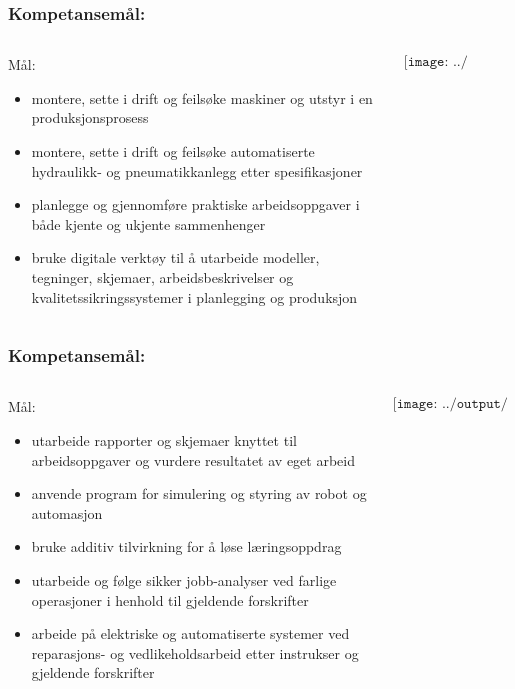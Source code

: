 \documentclass[aspectratio=169,xcolor=dvipsnames]{beamer}
\begin{document}
\begin{frame}
	\frametitle{Kompetansemål:}

	\begin{columns}
		\begin{column}{0.5\textwidth}
			Mål:
			\begin{itemize}
				
				\item montere, sette i drift og feilsøke maskiner og utstyr i en produksjonsprosess
				\item montere, sette i drift og feilsøke automatiserte hydraulikk- og pneumatikkanlegg etter spesifikasjoner 
				\item planlegge og gjennomføre praktiske arbeidsoppgaver i både kjente og ukjente sammenhenger 
				\item bruke digitale verktøy til å utarbeide modeller, tegninger, skjemaer, arbeidsbeskrivelser og kvalitetssikringssystemer i planlegging og produksjon 

			\end{itemize}
		\end{column}

		\begin{column}{0.5\textwidth}
			$$\texttt{[image: ../output/noGPLimages/udir.pdf]}$$
		\end{column}
	\end{columns}
\end{frame}
\begin{frame}
	\frametitle{Kompetansemål:}

	\begin{columns}
		\begin{column}{0.5\textwidth}
			Mål:
			\begin{itemize}
				\item utarbeide rapporter og skjemaer knyttet til arbeidsoppgaver og vurdere resultatet av eget arbeid 
				\item anvende program for simulering og styring av robot og automasjon 
				\item bruke additiv tilvirkning for å løse læringsoppdrag 
				\item utarbeide og følge sikker jobb-analyser ved farlige operasjoner i henhold til gjeldende forskrifter 
				\item arbeide på elektriske og automatiserte systemer ved reparasjons- og vedlikeholdsarbeid etter instrukser og gjeldende forskrifter

			\end{itemize}
		\end{column}

		\begin{column}{0.5\textwidth}
			$$\texttt{[image: ../output/noGPLimages/udir.pdf]}$$
		\end{column}
	\end{columns}
\end{frame}
\end{document}
